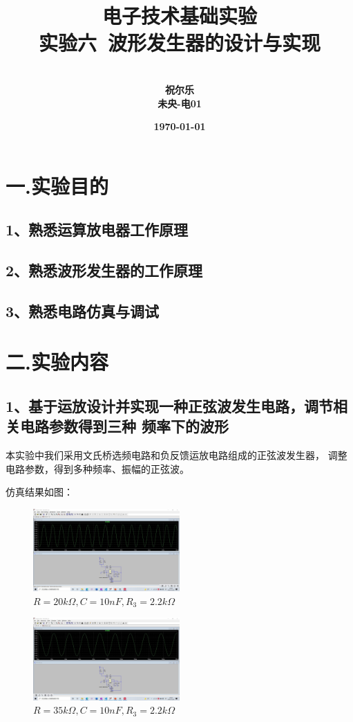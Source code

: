 \documentclass[UTF8]{ctexart}
\title{{电子技术基础实验} \\ \textbf{实验六\ 波形发生器的设计与实现
}}
\author{\\\textbf{祝尔乐}
        \\\textbf{未央-电01}
        }
\date{\textbf{\today}}
\begin{document}
\maketitle

\section*{一.实验目的}

\subsection*{1、熟悉运算放电器工作原理}
\subsection*{2、熟悉波形发生器的工作原理}
\subsection*{3、熟悉电路仿真与调试}

\section*{二.实验内容}

\subsection*{1、基于运放设计并实现一种正弦波发生电路，调节相关电路参数得到三种
频率下的波形}

本实验中我们采用文氏桥选频电路和负反馈运放电路组成的正弦波发生器，
调整电路参数，得到多种频率、振幅的正弦波。

仿真结果如图：

\begin{figure}[H]
        \centering
        \includegraphics[width = 0.5\textwidth]{1-1-10k-10n.jpg}
        \caption{$R = 20k \Omega, C = 10nF, R_3 = 2.2 k \Omega$}
\end{figure}

\begin{figure}[H]
        \centering
        \includegraphics[width = 0.5\textwidth]{1-1-35k-10n.jpg}
        \caption{$R = 35k \Omega, C = 10nF, R_3 = 2.2 k \Omega$}
\end{figure}
\end{document}
